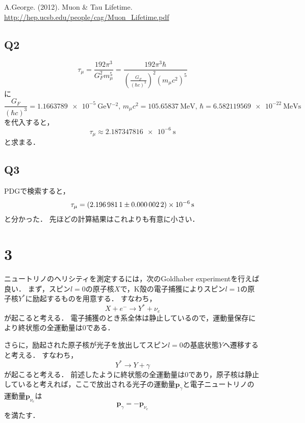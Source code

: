 \documentclass[a4paper,11pt]{jsarticle}
\begin{document}
\begin{thebibliography}{99}
   A.George. (2012). Muon \& Tau Lifetime.\\
  \url{http://hep.ucsb.edu/people/cag/Muon_Lifetime.pdf}
\end{thebibliography}

\subsection*{Q2}

\begin{equation}
  \tau_{\mu} = \frac{192\pi^3}{G_F^2m_{\mu}^5}= \frac{192\pi^3\hbar}{\left(\frac{G_F}{(\hbar c)^3}\right)^2(m_{\mu}c^2)^5}
\end{equation}
に
\begin{equation}
  \frac{G_F}{(\hbar c)^3} = \SI{1.1663789e-5}{\GeV^{-2}}, \, m_{\mu}c^2 = \SI{105.65837}{\MeV},\, \hbar = \SI{6.582119569e-22}{\MeV \s}
\end{equation}
を代入すると，
\begin{equation}
  \tau_{\mu} \approx \SI{2.187347816e-6}{\s}
\end{equation}
と求まる．

\subsection*{Q3}
PDGで検索すると，
\begin{equation}
  \tau_{\mu} = \SI[separate-uncertainty=true]{2.1969811+-0.0000022e-6}{\s}
\end{equation}
と分かった．
先ほどの計算結果はこれよりも有意に小さい．

\section*{3}
ニュートリノのヘリシティを測定するには，次のGoldhaber experimentを行えば良い．
まず，スピン$l=0$の原子核$X$で，K殻の電子捕獲によりスピン$l=1$の原子核$Y^*$に励起するものを用意する．
すなわち，
\begin{equation}
  X + e^- \to Y^* + \nu_{e}
\end{equation}
が起こると考える．
電子捕獲のとき系全体は静止しているので，運動量保存により終状態の全運動量は0である．

さらに，励起された原子核が光子を放出してスピン$l=0$の基底状態$Y$へ遷移すると考える．
すなわち，
\begin{equation}
  Y^* \to Y + \gamma
\end{equation}
が起こると考える．
前述したように終状態の全運動量は0であり，原子核は静止していると考えれば，ここで放出される光子の運動量$\bm{p}_{\gamma}$と電子ニュートリノの運動量$\bm{p}_{\nu_e}$は
\begin{equation}
  \bm{p}_{\gamma} = -\bm{p}_{\nu_e}
\end{equation}
を満たす．
\end{document}

